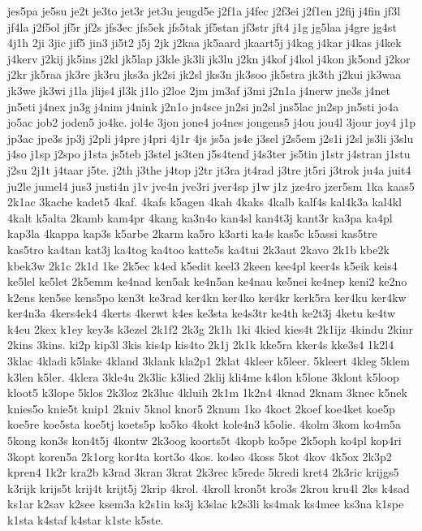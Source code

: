 {jes5pa
je5su
je2t
je3to
jet3r
jet3u
jeugd5e
j2f1a
j4fec
j2f3ei
j2f1en
j2fij
j4fin
jf3l
jf4la
j2f5ol
jf5r
jf2s
jfs3ec
jfs5ek
jfs5tak
jf5stan
jf3str
jft4
j1g
jg5laa
j4gre
jg4st
4j1h
2ji
3jic
jif5
jin3
ji5t2
j5j
2jk
j2kaa
jk5aard
jkaart5j
j4kag
j4kar
j4kas
j4kek
j4kerv
j2kij
jk5ins
j2kl
jk5lap
j3kle
jk3li
jk3lu
j2kn
j4kof
j4kol
j4kon
jk5ond
j2kor
j2kr
jk5raa
jk3re
jk3ru
jks3a
jk2si
jk2sl
jks3n
jk3soo
jk5stra
jk3th
j2kui
jk3waa
jk3we
jk3wi
j1la
jlijs4
jl3k
j1lo
j2loe
2jm
jm3af
j3mi
j2n1a
j4nerw
jne3s
j4net
jn5eti
j4nex
jn3g
j4nim
j4nink
j2n1o
jn4sce
jn2si
jn2sl
jns5lac
jn2sp
jn5sti
jo4a
jo5ac
job2
joden5
jo4ke.
jol4e
3jon
jone4
jo4nes
jongens5
j4ou
jou4l
3jour
joy4
j1p
jp3ac
jpe3s
jp3j
j2pli
j4pre
j4pri
4j1r
4js
js5a
js4e
j3sel
j2s5em
j2s1i
j2sl
js3li
j3slu
j4so
j1sp
j2spo
j1sta
js5teb
j3stel
js3ten
j5s4tend
j4s3ter
js5tin
j1str
j4stran
j1stu
j2su
2j1t
j4taar
j5te.
j2th
j3the
j4top
j2tr
jt3ra
jt4rad
j3tre
jt5ri
j3trok
ju4a
juit4
ju2le
jumel4
jus3
justi4n
j1v
jve4n
jve3ri
jver4sp
j1w
j1z
jze4ro
jzer5sm
1ka
kaas5
2k1ac
3kache
kadet5
4kaf.
4kafs
k5agen
4kah
4kaks
4kalb
kalf4s
kal4k3a
kal4kl
4kalt
k5alta
2kamb
kam4pr
4kang
ka3n4o
kan4sl
kan4t3j
kant3r
ka3pa
ka4pl
kap3la
4kappa
kap3s
k5arbe
2karm
ka5ro
k3arti
ka4s
kas5c
k5assi
kas5tre
kas5tro
ka4tan
kat3j
ka4tog
ka4too
katte5s
ka4tui
2k3aut
2kavo
2k1b
kbe2k
kbek3w
2k1c
2k1d
1ke
2k5ec
k4ed
k5edit
keel3
2keen
kee4pl
keer4s
k5eik
keis4
ke5lel
ke5let
2k5emm
ke4nad
ken5ak
ke4n5an
ke4nau
ke5nei
ke4nep
keni2
ke2no
k2ens
ken5se
kens5po
ken3t
ke3rad
ker4kn
ker4ko
ker4kr
kerk5ra
ker4ku
ker4kw
ker4n3a
4kers4ek4
4kerts
4kerwt
k4es
ke3sta
ke4s3tr
ke4th
ke2t3j
4ketu
ke4tw
k4eu
2kex
k1ey
key3s
k3ezel
2k1f2
2k3g
2k1h
1ki
4kied
kies4t
2k1ijz
4kindu
2kinr
2kins
3kins.
ki2p
kip3l
3kis
kis4p
kis4to
2k1j
2k1k
kke5ra
kker4s
kke3s4
1k2l4
3klac
4kladi
k5lake
4kland
3klank
kla2p1
2klat
4kleer
k5leer.
5kleert
4kleg
5klem
k3len
k5ler.
4klera
3kle4u
2k3lic
k3lied
2klij
kli4me
k4lon
k5lone
3klont
k5loop
kloot5
k3lope
5klos
2k3loz
2k3luc
4kluih
2k1m
1k2n4
4knad
2knam
3knec
k5nek
knies5o
knie5t
knip1
2kniv
5knol
knor5
2knum
1ko
4koct
2koef
koe4ket
koe5p
koe5re
koe5sta
koe5tj
koets5p
ko5ko
4kokt
kole4n3
k5olie.
4kolm
3kom
ko4m5a
5kong
kon3s
kon4t5j
4kontw
2k3oog
koorts5t
4kopb
ko5pe
2k5oph
ko4pl
kop4ri
3kopt
koren5a
2k1org
kor4ta
kort3o
4kos.
ko4so
4koss
5kot
4kov
4k5ox
2k3p2
kpren4
1k2r
kra2b
k3rad
3kran
3krat
2k3rec
k5rede
5kredi
kret4
2k3ric
krijgs5
k3rijk
krijs5t
krij4t
krijt5j
2krip
4krol.
4kroll
kron5t
kro3s
2krou
kru4l
2ks
k4sad
ks1ar
k2sav
k2see
ksem3a
k2s1in
ks3j
k3slac
k2s3li
ks4mak
ks4mee
ks3na
k1spe
k1sta
k4staf
k4star
k1ste
k5ste.
}
